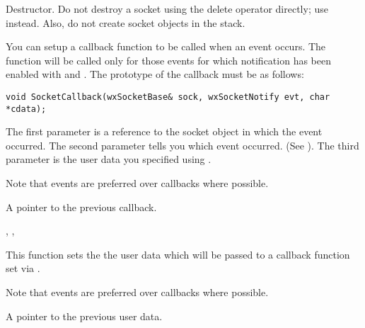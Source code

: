 
Destructor. Do not destroy a socket using the delete operator directly;
use  instead. Also, do not create
socket objects in the stack.

%
%
\label{wxsocketbasecallback}


You can setup a callback function to be called when an event occurs.
The function will be called only for those events for which notification
has been enabled with  and 
. The prototype of the
callback must be as follows:

\begin{verbatim}
void SocketCallback(wxSocketBase& sock, wxSocketNotify evt, char *cdata);
\end{verbatim}

The first parameter is a reference to the socket object in which the
event occurred. The second parameter tells you which event occurred.
(See ). The third parameter
is the user data you specified using .

Note that events are preferred over callbacks where possible.


A pointer to the previous callback.


, 
, 

%
%
\label{wxsocketbasecallbackdata}


This function sets the the user data which will be passed to a
callback function set via .

Note that events are preferred over callbacks where possible.


A pointer to the previous user data.

